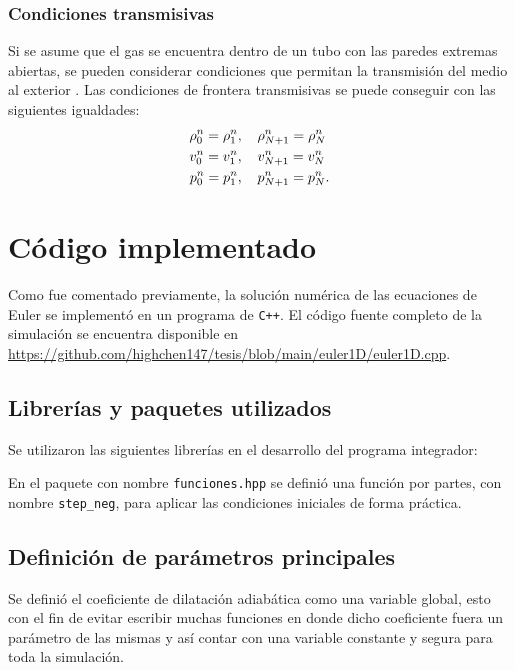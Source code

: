 \subsubsection{Condiciones transmisivas}
Si se asume que el gas se encuentra dentro de un tubo con las paredes extremas abiertas, se pueden considerar condiciones que permitan la transmisión del medio al exterior \cite{thesis-euler-godunov}. Las condiciones de frontera transmisivas se puede conseguir con las siguientes igualdades:
\begin{align}
	\rho_{0}^{n} = \rho_{1}^{n}, \hspace{4mm}&
	\rho_{N+1}^{n} = \rho_{N}^{n} \\
	v_{0}^{n} = v_{1}^{n}, \hspace{4mm}&
	v_{N+1}^{n} = v_{N}^{n} \\
	p_{0}^{n} = p_{1}^{n}, \hspace{4mm}&
	p_{N+1}^{n} = p_{N}^{n}.
\end{align}
\section{Código implementado}
\lstset{inputencoding=utf8/latin1}
Como fue comentado previamente, la solución numérica de las ecuaciones de Euler se implementó en un programa de \texttt{C++}. El código fuente completo de la simulación se encuentra disponible en \url{https://github.com/highchen147/tesis/blob/main/euler1D/euler1D.cpp}.

\subsection{Librerías y paquetes utilizados}
Se utilizaron las siguientes librerías en el desarrollo del programa integrador:


En el paquete con nombre \texttt{funciones.hpp} se definió una función por partes, con nombre \texttt{step\_neg}, para aplicar las condiciones iniciales de forma práctica.



\subsection{Definición de parámetros principales}
Se definió el coeficiente de dilatación adiabática como una variable global, esto con el fin de evitar escribir muchas funciones en donde dicho coeficiente fuera un parámetro de las mismas y así contar con una variable constante y segura para toda la simulación.

